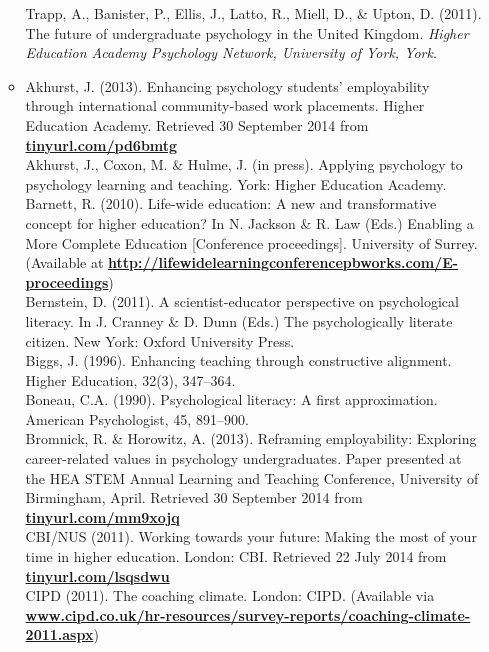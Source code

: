 \documentclass[
  11pt,
  letterpaper,
  oneside,
  open=any]{scrbook}
\begin{document}
\begin{itemize}
\begin{tcolorbox}
\begin{itemize}
    Trapp, A., Banister, P., Ellis, J., Latto, R., Miell, D., \& Upton,
    D. (2011). The future of undergraduate psychology in the United
    Kingdom. \emph{Higher Education Academy Psychology Network,
    University of York, York}.
  \item
    Akhurst, J. (2013). Enhancing psychology students' employability
    through international community-based work placements. Higher
    Education Academy. Retrieved 30 September 2014 from
    \href{http://www.tinyurl.com/pd6bmtg}{\textbf{tinyurl.com/pd6bmtg}}\\
    Akhurst, J., Coxon, M. \& Hulme, J. (in press). Applying psychology
    to psychology learning and teaching. York: Higher Education
    Academy.\\
    Barnett, R. (2010). Life-wide education: A new and transformative
    concept for higher education? In N. Jackson \& R. Law (Eds.)
    Enabling a More Complete Education {[}Conference proceedings{]}.
    University of Surrey. (Available at
    \href{http://www.http//lifewidelearningconference\%20.pbworks.com/E-proceedings}{\textbf{http://lifewidelearningconferencepbworks.com/E-proceedings}})\\
    Bernstein, D. (2011). A scientist-educator perspective on
    psychological literacy. In J. Cranney \& D. Dunn (Eds.) The
    psychologically literate citizen. New York: Oxford University
    Press.\\
    Biggs, J. (1996). Enhancing teaching through constructive alignment.
    Higher Education, 32(3), 347--364.\\
    Boneau, C.A. (1990). Psychological literacy: A first approximation.
    American Psychologist, 45, 891--900.\\
    Bromnick, R. \& Horowitz, A. (2013). Reframing employability:
    Exploring career-related values in psychology undergraduates. Paper
    presented at the HEA STEM Annual Learning and Teaching Conference,
    University of Birmingham, April. Retrieved 30 September 2014 from
    \href{http://www.tinyurl.com/mm9xojq}{\textbf{tinyurl.com/mm9xojq}}\\
    CBI/NUS (2011). Working towards your future: Making the most of your
    time in higher education. London: CBI. Retrieved 22 July 2014 from
    \href{http://www.tinyurl.com/lsqsdwu}{\textbf{tinyurl.com/lsqsdwu}}\\
    CIPD (2011). The coaching climate. London: CIPD. (Available via
    \href{http://www.www.cipd.co.uk/hr-resources/survey-reports/coaching-climate-2011.aspx}{\textbf{www.cipd.co.uk/hr-resources/survey-reports/coaching-climate-2011.aspx}})\\

\end{itemize}
\end{tcolorbox}
\end{itemize}
\end{document}
